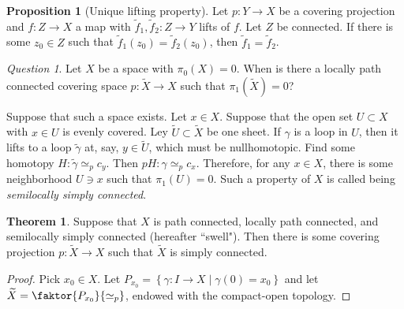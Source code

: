 \documentclass[10pt,letterpaper,cm]{nupset}
\theoremstyle{definition}
\theoremstyle{theorem}
\newtheorem{theorem}[definition]{Theorem}
\newtheorem{prop}[definition]{Proposition}
\theoremstyle{remark}
\newtheorem*{question}{Question}
\newcommand{\1}{\mathbb{1}}
\newcommand{\0}{\vec 0}
\begin{document}
\begin{prop}[Unique lifting property]\label{ULP}
Let $p: Y \to X$ be a covering projection and $f: Z \to X$ a map with $\tilde{f}_1, \tilde{f}_2 : Z \to Y$ lifts of $f$. Let $Z$ be connected. If there is some $z_0 \in Z$ such that $\tilde{f}_1(z_0) = \tilde{f}_2(z_0)$, then $\tilde{f}_1 =  \tilde{f}_2$.
\end{prop}

\begin{question}
Let $X$ be a space with  $\pi_0(X) =0$. When is there a locally path connected covering space $p: \widetilde{X} \to X$ such that $\pi_1\left(\widetilde{X}\right) =0$? 
\end{question}

Suppose that such a space exists. Let $x \in X$. Suppose that the open set $U \subset X$ with $x\in U$ is evenly covered. Ley $\widetilde{U} \subset \widetilde{X}$ be one sheet.  If $\gamma$ is a loop in $U$, then it lifts to a loop $\tilde{\gamma}$ at, say, $y \in \widetilde{U}$, which must be nullhomotopic. Find some homotopy $H: \tilde{\gamma} \simeq_p c_y$. Then $pH : \gamma \simeq_p c_x$. Therefore, for any $x\in X$, there is some neighborhood $U\ni x$ such that $\pi_1(U) =0$.
Such a property of $X$ is called being \textit{semilocally simply connected}. 


\begin{theorem}
Suppose that $X$ is path connected, locally path connected, and semilocally simply connected (hereafter ``swell"). Then there is some covering projection $p: \widetilde{X} \to X$ such that $\widetilde{X}$ is simply connected. 
\end{theorem}
\begin{proof}
Pick $x_0 \in X$. Let $P_{x_0} =  \left\{\gamma : I \to X \mid \gamma(0) = x_0\right\}$ and let $\widetilde{X} = \faktor{P_{x_0}}{\simeq_p}$, endowed with the compact-open topology. 
\end{proof}
\end{document}
